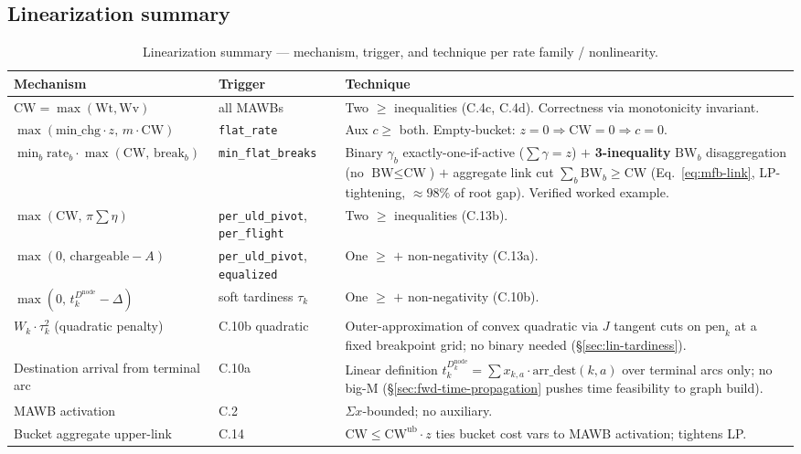 \documentclass[11pt,a4paper]{article}
\theoremstyle{definition}
\begin{document}
\subsection{Linearization summary}
\label{sec:lin-summary}

\begin{table}[H]
\centering
\caption{Linearization summary --- mechanism, trigger, and technique per rate family / nonlinearity.}
\label{tab:lin-summary}
\begin{tabular}{p{4.0cm}p{4.0cm}p{6.5cm}}
\toprule
Mechanism & Trigger & Technique \\
\midrule
$\text{CW} = \max(\text{Wt}, \text{Wv})$ & all MAWBs & Two $\geq$ inequalities (C.4c, C.4d). Correctness via monotonicity invariant. \\
$\max(\text{min\_chg} \cdot z,\, m \cdot \text{CW})$ & \texttt{flat\_rate} & Aux $c \geq$ both. Empty-bucket: $z = 0 \Rightarrow \text{CW} = 0 \Rightarrow c = 0$. \\
$\min_b \text{rate}_b \cdot \max(\text{CW},\, \text{break}_b)$ & \texttt{min\_flat\_breaks} & Binary $\gamma_b$ exactly-one-if-active ($\sum \gamma = z$) $+$ \textbf{3-inequality} $\text{BW}_b$ disaggregation (no $\text{BW} \leq \text{CW}$) $+$ aggregate link cut $\sum_b \text{BW}_b \geq \text{CW}$ (Eq.~\ref{eq:mfb-link}, LP-tightening, $\approx\!98\%$ of root gap). Verified worked example. \\
$\max(\text{CW},\, \pi \sum \eta)$ & \texttt{per\_uld\_pivot}, \texttt{per\_flight} & Two $\geq$ inequalities (C.13b). \\
$\max(0,\, \text{chargeable} - A)$ & \texttt{per\_uld\_pivot}, \texttt{equalized} & One $\geq$ $+$ non-negativity (C.13a). \\
$\max(0,\, t_k^{D^{\text{node}}} - \Delta)$ & soft tardiness $\tau_k$ & One $\geq$ $+$ non-negativity (C.10b). \\
$W_k \cdot \tau_k^2$ (quadratic penalty) & C.10b quadratic & Outer-approximation of convex quadratic via $J$ tangent cuts on $\text{pen}_k$ at a fixed breakpoint grid; no binary needed (\S\ref{sec:lin-tardiness}). \\
Destination arrival from terminal arc & C.10a & Linear definition $t_k^{D_k^{\text{node}}} = \sum x_{k,a} \cdot \text{arr\_dest}(k,a)$ over terminal arcs only; no big-M (\S\ref{sec:fwd-time-propagation} pushes time feasibility to graph build). \\
MAWB activation & C.2 & $\Sigma x$-bounded; no auxiliary. \\
Bucket aggregate upper-link & C.14 & $\text{CW} \leq \text{CW}^{\text{ub}} \cdot z$ ties bucket cost vars to MAWB activation; tightens LP. \\
\bottomrule
\end{tabular}
\end{table}
\end{document}
